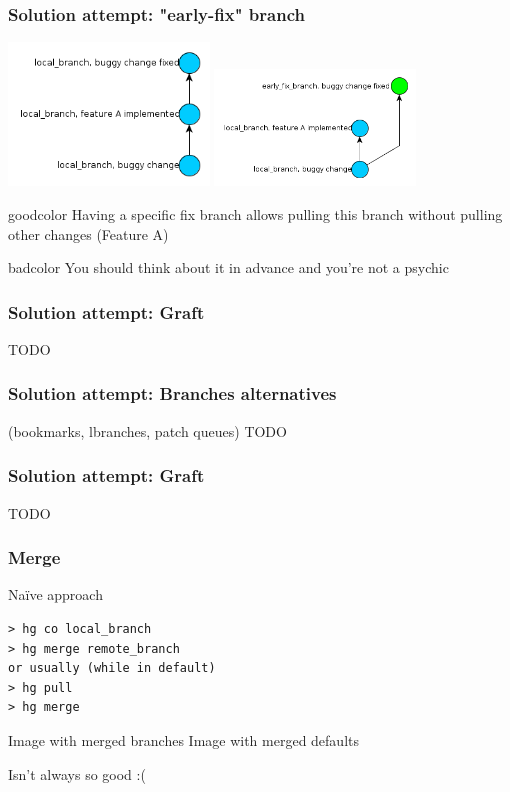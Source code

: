 \documentclass{beamer}
\begin{document}
\begin{frame}
\frametitle{Solution attempt: "early-fix" branch}
\begin{multicols}{2}
\includegraphics[width=0.4\textwidth]{img/early_fix_branch_bad}
\columnbreak
{}
\includegraphics[width=0.4\textwidth]{img/early_fix_branch_good}
\end{multicols}
\begin{beamercolorbox}[rounded=true,center,shadow=true]{goodcolor}
  Having a specific fix branch allows pulling this branch without pulling other changes (Feature A)
\end{beamercolorbox}
\begin{beamercolorbox}[rounded=true,center,shadow=true]{badcolor}
  You should think about it in advance and you're not a psychic
\end{beamercolorbox}
\end{frame}

\begin{frame}
\frametitle{Solution attempt: Graft}
TODO
\end{frame}

\begin{frame} 
\frametitle{Solution attempt: Branches alternatives}
(bookmarks, lbranches, patch queues)
TODO
\end{frame}


\begin{frame}
\frametitle{Solution attempt: Graft}
TODO
\end{frame}


\begin{frame}[fragile]
\frametitle{Merge}
\begin{exampleblock}{Naïve approach}
\begin{verbatim}
> hg co local_branch
> hg merge remote_branch
or usually (while in default)
> hg pull 
> hg merge 
\end{verbatim}
\end{exampleblock}
\begin{multicols}{2}
Image with merged branches
\columnbreak
{}
Image with merged defaults
\end{multicols}
\begin{center}
Isn't always so good :( 
\end{center}
\end{frame}
\end{document}
